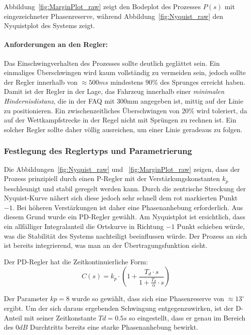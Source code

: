 \documentclass[main.tex]{subfiles} %
\begin{document}
Abbildung~\ref{fig:MarginPlot_raw} zeigt den Bodeplot des Prozesses $P(s)$ mit
eingezeichneter Phasenreserve, während Abbildung~\ref{fig:Nyquist_raw} den
Nyquistplot des Systems zeigt.

\paragraph{Anforderungen an den Regler:} Das Einschwingverhalten des Prozesses sollte deutlich geglättet sein. Ein
einmaliges Überschwingen wird kaum vollständig zu vermeiden sein, jedoch sollte
der Regler innerhalb von $\approx 500 ms$ mindestens 90\% des Sprunges erreicht
haben. Damit ist der Regler in der Lage, das Fahrzeug innerhalb einer
\textit{minimalen Hindernisdistanz}, die in der FAQ mit 300mm angegeben ist,
mittig auf der Linie zu positionieren. Ein zwischenzeitliches Überschwingen von
20\% wird toleriert, da auf der Wettkampfstrecke in der Regel nicht mit
Sprüngen zu rechnen ist. Ein solcher Regler sollte daher völlig ausreichen, um
einer Linie geradeaus zu folgen.

\subsubsection*{Festlegung des Reglertyps und Parametrierung}

Die Abbildungen~\ref{fig:Nyquist_raw} und ~\ref{fig:MarginPlot_raw} zeigen,
dass der Prozess prinzipiell durch einen P-Regler mit der
Verstärkungskonstanten $k_p$ beschleunigt und stabil geregelt werden kann.
Durch die zentrische Streckung der Nyquist-Kurve nähert sich diese jedoch sehr
schnell dem rot markierten Punkt $-1$. Bei höheren Verstärkungen ist daher eine
Phasenanhebung erforderlich. Aus diesem Grund wurde ein PD-Regler gewählt. Am
Nyquistplot ist ersichtlich, dass ein allfälliger Integralanteil die Ortskurve
in Richtung $-1$ Punkt schieben würde, was die Stabilität des Systems
nachteiligt beeinflussen würde. Der Prozess an sich ist bereits integrierend,
was man an der Übertragungsfunktion sieht.

Der PD-Regler hat die Zeitkontinuierliche Form:
\[
    C(s) = k_p \cdot (1 + \frac{T_d \cdot s}{1 + \frac{T_d}{\alpha} \cdot s})
\]

Der Parameter $kp = 8$ wurde so gewählt, dass sich eine Phasenreserve von
$\approx 13^\circ$ ergibt. Um der sich daraus ergebenden Schwingung
entgegenzuwirken, ist der D-Anteil mit seiner Zeitkonstante $Td = 0.5s$ so
eingestellt, dass er genau im Bereich des $0 dB$ Durchtritts bereits eine
starke Phasenanhebung bewirkt.
\end{document}
